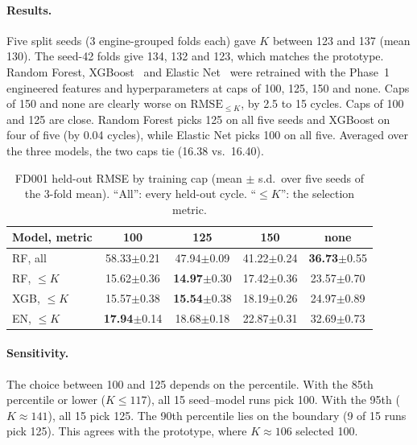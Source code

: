 \paragraph{Results.}
Five split seeds (3 engine-grouped folds each) gave $K$ between 123 and
137 (mean 130). The seed-42 folds give 134, 132 and 123, which matches the
prototype. Random Forest, XGBoost~\cite{Chen2016xgboost} and Elastic
Net~\cite{Zou2005regularization} were retrained with the Phase~1 engineered
features and hyperparameters at caps of 100, 125, 150 and none.
Caps of 150 and none are clearly worse on $\mathrm{RMSE}_{\leq K}$, by 2.5 to
15 cycles. Caps of 100 and 125 are close. Random Forest picks 125 on all five
seeds and XGBoost on four of five (by 0.04 cycles), while Elastic Net picks 100 on all five.
Averaged over the three models, the two caps tie (16.38 vs.\ 16.40).

\begin{table}[t]
\centering
\caption{FD001 held-out RMSE by training cap (mean $\pm$ s.d.\ over five seeds of
the 3-fold mean). ``All'': every held-out cycle. ``$\leq K$'': the selection metric.}
\label{tab:target_caps}
\footnotesize
\setlength{\tabcolsep}{2.5pt}
\begin{tabular}{lcccc}
\hline
Model, metric & 100 & 125 & 150 & none \\
\hline
RF, all & 58.33$\pm$0.21 & 47.94$\pm$0.09 & 41.22$\pm$0.24 & \textbf{36.73}$\pm$0.55 \\
RF, $\leq K$ & 15.62$\pm$0.36 & \textbf{14.97}$\pm$0.30 & 17.42$\pm$0.36 & 23.57$\pm$0.70 \\
XGB, $\leq K$ & 15.57$\pm$0.38 & \textbf{15.54}$\pm$0.38 & 18.19$\pm$0.26 & 24.97$\pm$0.89 \\
EN, $\leq K$ & \textbf{17.94}$\pm$0.14 & 18.68$\pm$0.18 & 22.87$\pm$0.31 & 32.69$\pm$0.73 \\
\hline
\end{tabular}
\end{table}

\paragraph{Sensitivity.}
The choice between 100 and 125 depends on the percentile. With the 85th
percentile or lower ($K\leq117$), all 15 seed--model runs pick 100. With the
95th ($K\approx141$), all 15 pick 125. The 90th percentile lies on the
boundary (9 of 15 runs pick 125). This agrees with the prototype, where
$K\approx106$ selected 100.

